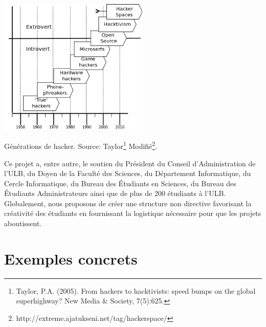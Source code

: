 \documentclass{article}
\begin{document}
\begin{center}
\includegraphics[height=65mm]{hacker-generations-divided.png}

Générations de hacker. Source: Taylor\footnote{Taylor,  P.A. (2005). From hackers to hacktivists: speed bumps on the global  superhighway? New Media \& Society, 7(5):625.} Modifié\footnote{http://extreme.ajatukseni.net/tag/hackerspace/}.
\end{center}

Ce projet a, entre autre, le soutien du Président du Conseil d'Administration de l'ULB, du Doyen de la Faculté des Sciences, du Département Informatique, du Cercle Informatique, du Bureau des Étudiants en Sciences, du Bureau des Étudiants Administrateurs ainsi que de plus de 200 étudiants à l'ULB. Globalement, nous proposons de créer une structure non directive favorisant la créativité des étudiants en fournissant la logistique nécessaire pour que les projets aboutissent.

\section{Exemples concrets}
\end{document}
